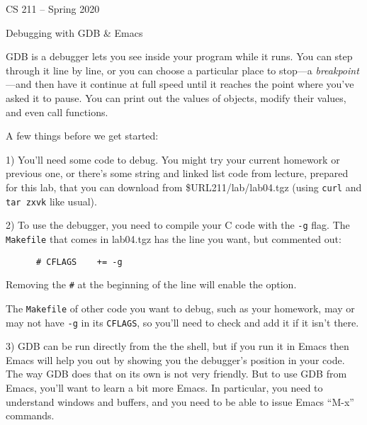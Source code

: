 \documentclass[11pt]{article}
\def\LabTGZ{\$URL211/lab/lab04.tgz}
\begin{document}
%

\begin{center}
  \sffamily
  CS 211 – Spring 2020
  \par
  \Huge
  Debugging
  \Large
  with GDB \& Emacs
\end{center}

\begin{multicols}{2}

GDB is a debugger lets you see inside your program while it runs. You
  can step through it line by line, or you can choose a particular place
  to stop—a \emph{breakpoint}—and then have it continue at full speed
  until it reaches the point where you’ve asked it to pause. You can
  print out the values of objects, modify their values, and even call
  functions.

  A few things before we get started:


      1) You’ll need some code to debug. You might try your current
      homework or previous one, or there’s some string and linked list
      code from lecture, prepared for this lab, that you can download
      from \textsf{\LabTGZ} (using \verb!curl! and \verb!tar zxvk!
      like usual).

      2) To use the debugger, you need to compile your C code with the
      \verb!-g! flag. The \verb!Makefile! that comes in
      \textsf{lab04.tgz} has
      the line you want, but commented out:
      \begin{verbatim}
      # CFLAGS    += -g\end{verbatim}

      Removing the \verb!#! at the beginning of the line will enable the
      option.

      The \verb!Makefile! of other code you want to debug, such as your
      homework, may or may not have \verb!-g! in its \verb!CFLAGS!, so
      you’ll need to check and add it if it isn’t there.

      3) GDB can be run directly from the the shell, but if you run it
      in Emacs then Emacs will help you out by showing you the
      debugger’s position in your code. The way GDB does that on its own
      is not very friendly. But to use GDB from Emacs, you’ll want to
      learn a bit more Emacs. In particular, you need to understand
      windows and buffers, and you need to be able to issue Emacs
      “\textsf{M-x}” commands.



\end{multicols}
\end{document}
